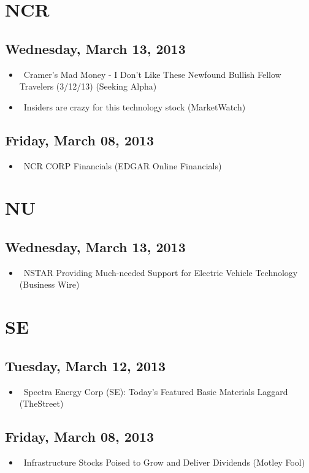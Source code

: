 \documentclass[11pt,asymmetric]{article}
\begin{document}
\section*{NCR}

\subsection*{Wednesday, March 13, 2013}
\begin{itemize}
\item\ Cramer's Mad Money - I Don't Like These Newfound Bullish Fellow Travelers (3/12/13) (Seeking Alpha)
\item\ Insiders are crazy for this technology stock (MarketWatch)
\end{itemize}
\subsection*{Friday, March 08, 2013}
\begin{itemize}
\item\ NCR CORP Financials (EDGAR Online Financials)
\end{itemize}

\section*{NU}

\subsection*{Wednesday, March 13, 2013}
\begin{itemize}
\item\ NSTAR Providing Much-needed Support for Electric Vehicle Technology (Business Wire)
\end{itemize}

\section*{SE}

\subsection*{Tuesday, March 12, 2013}
\begin{itemize}
\item\ Spectra Energy Corp (SE): Today's Featured Basic Materials Laggard (TheStreet)
\end{itemize}
\subsection*{Friday, March 08, 2013}
\begin{itemize}
\item\ Infrastructure Stocks Poised to Grow and Deliver Dividends (Motley Fool)
\end{itemize}
\end{document}
